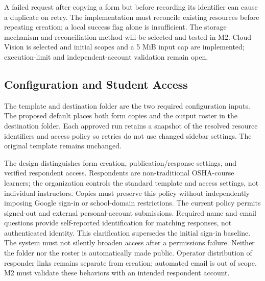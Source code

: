 A failed request after copying a form but before recording its identifier can
cause a duplicate on retry. The implementation must reconcile existing resources
before repeating creation; a local success flag alone is insufficient. The
storage mechanism and reconciliation method will be selected and tested in M2.
Cloud Vision is selected and initial scopes and a 5 MiB input cap are implemented;
execution-limit and independent-account validation remain open.

\subsection{Configuration and Student Access}
The template and destination folder are the two required configuration inputs.
The proposed default places both form copies and the output roster in the
destination folder. Each approved run retains a snapshot of the resolved resource
identifiers and access policy so retries do not use changed sidebar settings.
The original template remains unchanged.

The design distinguishes form creation, publication/response settings, and
verified respondent access. Respondents are non-traditional OSHA-course learners;
the organization controls the standard template and access settings, not
individual instructors. Copies must preserve this policy without independently
imposing Google sign-in or school-domain restrictions. The current policy permits
signed-out and external personal-account submissions. Required name and email
questions provide self-reported identification for matching responses, not
authenticated identity. This clarification supersedes the initial sign-in baseline.
The system must not silently broaden access after a permissions failure. Neither
the folder nor the roster is automatically made public. Operator distribution
of responder links remains separate from creation; automated email is out of scope.
M2 must validate these behaviors with an intended respondent account.
